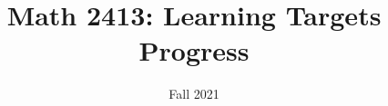 \documentclass{article}
\title{Math 2413: Learning Targets Progress}
\date{Fall 2021}
\begin{document}
\newcommand{\bxi}{\tikz \draw[thick] (0,0) rectangle ++(0.5,0.5) ++ (-0.20,-0.25) node {\cmark};}
\newcommand{\bxI}{\tikz \draw[thick] (0,0) rectangle ++(0.5,0.5);}
\newcommand{\cxi}{\tikz \draw[thick] (0cm,0cm) circle(0.25cm) ++ (0.03,0) node {\cmark};}
\newcommand{\cxI}{\tikz \draw[thick] (0cm,0cm) circle(0.25cm);}
\end{document}
